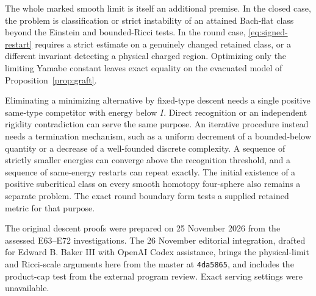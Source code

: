 \documentclass[11pt,letterpaper]{article}
\numberwithin{equation}{section}
\theoremstyle{remark}
\begin{document}
The whole marked smooth limit is itself an additional premise.
In the closed case, the problem is classification or strict
instability of an attained Bach-flat class beyond
the Einstein and bounded-Ricci tests. In the round case,
\eqref{eq:signed-restart} requires a strict estimate on a
genuinely changed retained class, or a different invariant
detecting a physical charged region. Optimizing only the limiting
Yamabe constant leaves exact equality on the evacuated model of
Proposition~\ref{prop:graft}.

Eliminating a minimizing alternative by fixed-type descent needs
a single positive same-type competitor with energy below \(I\).
Direct recognition or an independent rigidity contradiction can
serve the same purpose.
An iterative procedure instead needs a termination mechanism,
such as a uniform decrement of a bounded-below quantity or a
decrease of a well-founded discrete complexity. A sequence of
strictly smaller energies can converge above the recognition
threshold, and a sequence of same-energy restarts can repeat
exactly. The initial existence of a positive subcritical class
on every smooth homotopy four-sphere also remains a separate
problem. The exact round boundary form tests a supplied
retained metric for that purpose.

The original descent proofs were prepared on 25 November 2026 from
the assessed E63--E72 investigations. The 26 November editorial
integration, drafted for Edward B. Baker III with OpenAI Codex
assistance, brings the physical-limit and Ricci-scale arguments here
from the master at \texttt{4da5865}, and includes the product-cap test
from the external program review. Exact serving settings were unavailable.



\end{document}
